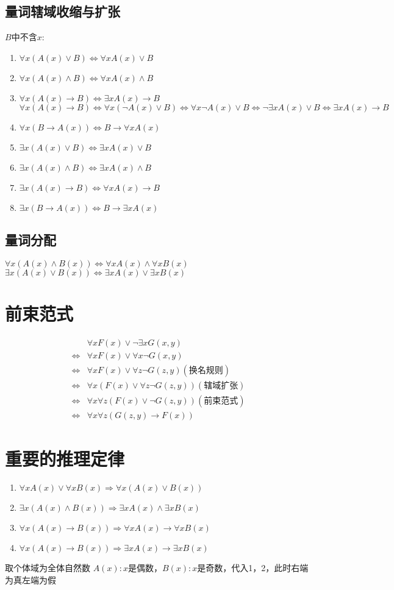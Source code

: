 \documentclass{book}
\newcommand{\Eqv}{\Leftrightarrow}
\newcommand{\To}{\Rightarrow}
\newcommand{\A}{\forall}
\newcommand{\E}{\exists}
\begin{document}
\subsection{量词辖域收缩与扩张}
$B$中不含$x$:
\begin{enumerate}
    \item $\A x(A(x)\lor B)\Eqv \A xA(x)\lor B$
    \item $\A x(A(x)\land B)\Eqv \A xA(x)\land B$
    \item $\A x(A(x)\to B)\Eqv \E xA(x)\to B$\\
        $\A x(A(x)\to B)\Eqv \A x(\neg A(x)\lor B)\Eqv  \A x\neg A(x)\lor B\Eqv\neg\E xA(x)\lor B\Eqv \E xA(x)\to B$
    \item $\A x(B\to A(x))\Eqv B\to \A xA(x)$
    \item $\E x(A(x)\lor B)\Eqv\E xA(x)\lor B$
    \item $\E x(A(x)\land B)\Eqv \E xA(x)\land B$
    \item $\E x(A(x)\to B)\Eqv \A xA(x)\to B$
    \item $\E x(B\to A(x))\Eqv B\to \E xA(x)$
\end{enumerate}
\subsection{量词分配}
\noindent
$\A x(A(x)\land B(x))\Eqv \A xA(x)\land \A xB(x)$\\
$\E x(A(x)\lor B(x))\Eqv \E xA(x)\lor \E xB(x)$
\section{前束范式}
\begin{align*}
    &\A xF(x)\lor\neg\E xG(x,y)\\
    \Eqv& \A xF(x)\lor \A x\neg G(x,y)\\
    \Eqv& \A xF(x)\lor\A z\neg G(z,y) (\mbox{换名规则})\\
    \Eqv& \A x(F(x)\lor \A z\neg G(z,y)) (\mbox{辖域扩张})\\
    \Eqv& \A x\A z(F(x)\lor\neg G(z,y)) (\mbox{前束范式})\\
    \Eqv& \A x\A z(G(z,y)\to F(x))
\end{align*}
\section{重要的推理定律}
\begin{enumerate}
    \item $\A xA(x)\lor \A xB(x)\To \A x(A(x)\lor B(x))$
    \item $\E x(A(x)\land B(x))\To \E xA(x)\land \E xB(x)$
    \item $\A x(A(x)\to B(x))\To \A xA(x)\to \A xB(x)$
    \item $\A x(A(x)\to B(x))\To \E xA(x)\to \E xB(x)$
\end{enumerate}
取个体域为全体自然数
$A(x):x$是偶数，$B(x):x$是奇数，代入1，2，此时右端为真左端为假
\end{document}
